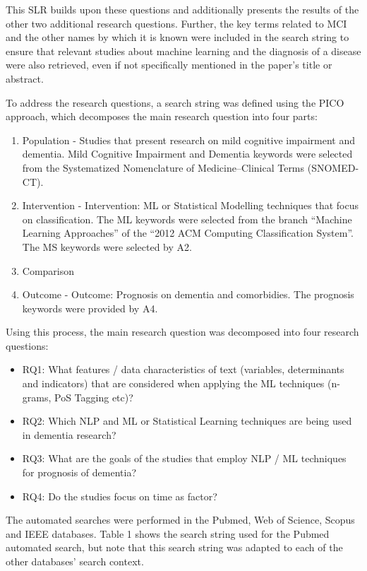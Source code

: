\documentclass[12pt]{article}
\begin{document}
This SLR builds upon these questions and additionally presents the results of the other two additional research questions. Further, the key terms related to MCI and the other names by which it is known were included in the search string to ensure that relevant studies about machine learning and the diagnosis of a disease were also retrieved, even if not specifically mentioned in the paper's title or abstract.
\par 
To address the research questions, a search string was defined using the PICO approach, which decomposes the main research question into four parts: 
\begin{enumerate}
	\item Population - Studies that present research on mild cognitive impairment and dementia. Mild Cognitive Impairment and Dementia keywords were selected from the Systematized Nomenclature of Medicine–Clinical Terms (SNOMED-CT).
	\item Intervention - Intervention: ML or Statistical Modelling techniques that focus on classification. The ML keywords were selected from the branch “Machine Learning Approaches” of the “2012 ACM Computing Classification System”. The MS keywords were selected by A2.
	\item Comparison
	\item Outcome - Outcome: Prognosis on dementia and comorbidies. The prognosis keywords were provided
by A4.
\end{enumerate}

Using this process, the main research question was decomposed  into four research questions:
\begin{itemize}
	\item RQ1: What features / data characteristics of text (variables, determinants and indicators) that are considered when applying the ML techniques (n-grams, PoS Tagging etc)?
	\item RQ2: Which NLP and ML or Statistical Learning techniques are being used in dementia research?
	\item RQ3: What are the goals of the studies that employ NLP / ML techniques for prognosis of dementia?
	\item RQ4: Do the studies focus on time as factor?
\end{itemize}
\par 
The automated searches were performed in the Pubmed, Web of Science, Scopus and IEEE databases. Table 1 shows the search string used for the Pubmed automated search, but note that this search string was adapted to each of the other databases’ search context.
\end{document}
